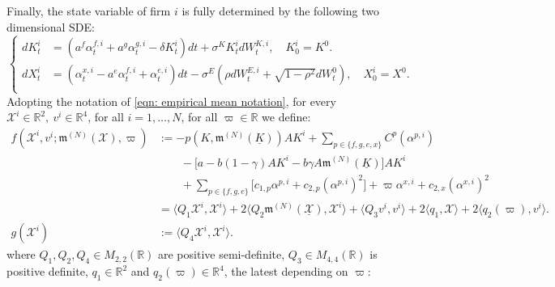 \documentclass[11pt,twoside]{amsart}
\theoremstyle{definition}
\numberwithin{equation}{section}
\newcommand{\w}{\varpi}
\newcommand{\R}{\mathbb{R}}
\begin{document}
Finally, the state variable of firm $i$ is fully determined by the following two dimensional SDE: 
\begin{equation*}
\begin{cases}
dK^i_t &= (a^f \alpha^{f,i}_t + a^g \alpha^{g,i}_t - \delta K^i_t) dt + \sigma^K K^i_t dW^{K,i}_t, \quad K^i_0=K^0.\\
dX^i_t &= (\alpha^{x,i}_t - a^e \alpha^{f,i}_t + \alpha^{e,i}_t) dt -\sigma^E(\rho dW^{E,i}_t + \sqrt{1- \rho^2} dW^0_t), \quad X^i_0=X^0.\\
\end{cases}
\end{equation*}
Adopting the notation of \eqref{eqn: empirical mean notation}, for every $\mathcal{X}^i\in \R^2,\  v^i\in \R^4$, for all $i = 1,\dots,N$, for all $\w\in\R$ we define:
\begin{align*}
f(\mathcal{X}^i,v^i;\mathfrak{m}^{(N)}(\mathcal{X}),\w) &:= -p(K,\mathfrak{m}^{(N)}(\underline{K})) AK^i +\sum_{p \in\{ f,g,e,x\}} C^p(\alpha^{p,i}) \\
&\qquad-\Big[ a-b(1-\gamma)AK^i - b\gamma A\mathfrak{m}^{(N)}(\underline{K})\Big]AK^i\\
&\qquad+  \sum_{p \in \{f,g,e\} } \Big[c_{1,p}\alpha^{p,i} + c_{2,p} (\alpha^{p,i})^2\Big]+ \w\alpha^{x,i} + c_{2,x} (\alpha^{x,i})^2\\
 &= \langle Q_1 \mathcal{X}^i ,\mathcal{X}^i\rangle+ 2\langle {Q}_2 \mathfrak{m}^{(N)}(\underline{\mathcal{X}}), \mathcal{X}^i\rangle + \langle Q_3 v^i, v^i\rangle + 2\langle q_1, \mathcal{X}\rangle + 2 \langle q_2(\w),v^i\rangle.\\
g(\mathcal{X}^i)&:= \langle Q_4\mathcal{X}^i, \mathcal{X}^i\rangle.
\end{align*}
where $Q_1,Q_2,Q_4\in M_{2,2}(\mathbb{R})$ are positive semi-definite, $Q_3\in M_{4,4}(\mathbb{R})$ is positive definite, $q_1\in\mathbb{R}^2$ and $q_2(\w)\in\mathbb{R}^4$, the latest depending on $\w$:
\end{document}

